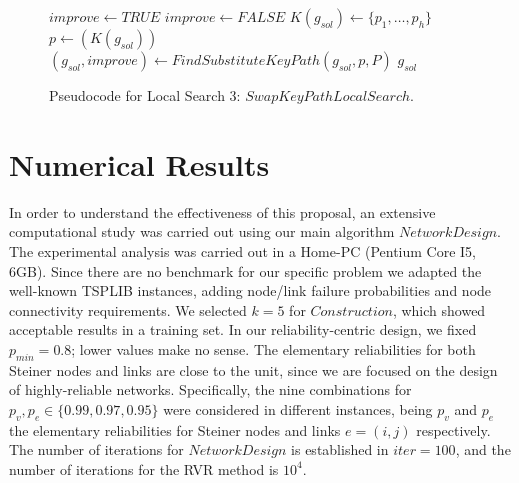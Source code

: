 \documentclass{llncs}
\begin{document}
\begin{figure}[H]
\begin{algorithm}[H]
\caption{$g_{sol} = SwapKeyPathLocalSearch(G_B,C,g_{sol},P)$}
\begin{algorithmic}[1]
\STATE $improve \leftarrow TRUE$
\STATE $improve \leftarrow FALSE$
\STATE $K(g_{sol}) \leftarrow \{p_1,\ldots,p_h\}$ 
\STATE $p \leftarrow(K(g_{sol}))$ 
\STATE $(g_{sol},improve) \leftarrow FindSubstituteKeyPath(g_{sol},p,P)$
\ENDWHILE
\ENDWHILE
\RETURN $g_{sol}$
\end{algorithmic}
\end{algorithm}
\caption{Pseudocode for Local Search 3: $SwapKeyPathLocalSearch$.\label{alg-kpls2}}
\end{figure}


\section{Numerical Results}\label{results}
In order to understand the effectiveness of this proposal, an extensive computational study was carried out using our main algorithm $NetworkDesign$. The experimental analysis was carried out in a Home-PC (Pentium Core I5, 6GB). Since there are no benchmark for our specific problem we adapted the well-known TSPLIB instances, adding node/link failure probabilities and node connectivity requirements. We selected $k=5$ for $Construction$, which showed acceptable results in a training set. In our reliability-centric design, we fixed $p_{min}=0.8$; lower values make no sense. The elementary reliabilities for both Steiner nodes and links are close to the unit, since we are focused on the design of highly-reliable networks. Specifically, the nine combinations for $p_{v},p_{e} \in \{0.99, 0.97,0.95\}$ were considered in different instances, being $p_v$ and $p_e$ the elementary reliabilities for Steiner nodes and links $e=(i,j)$ respectively. The number of iterations for $NetworkDesign$ is established in $iter=100$, and the number of iterations for the RVR method is $10^4$. 
\end{document}
